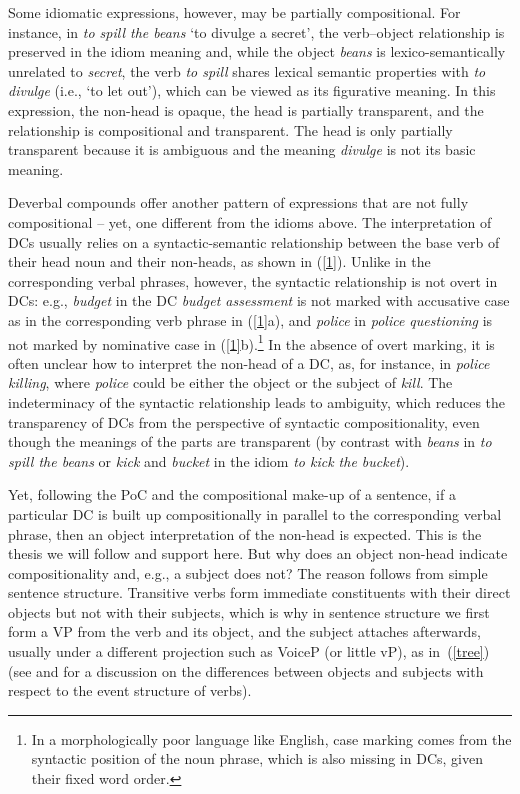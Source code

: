 \documentclass[output=paper]{langsci/langscibook}
\begin{document}
Some idiomatic expressions, however, may be partially compositional. For instance, in \textit{to spill the beans} \lq to divulge a secret\rq, the verb--object relationship is preserved in the idiom meaning and, while the object \textit{beans} is lexico-semantically unrelated to \textit{secret}, the verb \textit{to spill} shares lexical semantic properties with \textit{to divulge} (i.e., \lq to let out\rq), which can be viewed as its figurative meaning. In this expression, the non-head is opaque, the head is partially transparent, and the relationship is compositional and transparent. The head is only partially transparent because it is ambiguous and the meaning \textit{divulge} is not its basic meaning.

 {Deverbal compounds offer another pattern of expressions that are not fully compositional -- yet, one different from the idioms above. The interpretation of DCs usually relies on a syntactic-semantic relationship between the base verb of their head noun and their non-heads, as shown in (\ref{1}). Unlike in the corresponding verbal phrases, however, the syntactic relationship is not overt in DCs: e.g., \textit{budget} in the DC \textit{budget assessment} is not marked with accusative case as in the corresponding verb phrase in (\ref{1}a), and \textit{police} in \textit{police questioning} is not marked by nominative case in (\ref{1}b).}\footnote{ {In a morphologically poor language like English,  case marking comes from the syntactic position of the noun phrase, which is also missing in DCs, given their fixed word order.}}  {In the absence of overt marking, it is often unclear how to interpret the non-head of a DC, as, for instance, in \textit{police killing}, where \textit{police} could be either the object or the subject of \textit{kill}. The indeterminacy of the syntactic relationship leads to ambiguity, which reduces the transparency of DCs from the perspective of syntactic compositionality, even though the meanings of the parts are transparent (by contrast with \textit{beans} in \textit{to spill the beans} or \textit{kick} and \textit{bucket} in the idiom \textit{to kick the bucket}).}


 {Yet, following the PoC and the compositional make-up of a sentence, if a particular DC is built up compositionally in parallel to the corresponding verbal phrase, then an object interpretation of the non-head is expected. This is the thesis we will follow and support  here. But why does an object non-head indicate compositionality and, e.g., a subject does not? The reason follows from simple sentence structure. Transitive verbs form immediate constituents with their direct objects but not with their subjects, which is why in sentence structure we first form a VP from the verb and its object, and the subject attaches afterwards, usually under a different projection such as VoiceP (or little vP), as in~(\ref{tree}) (see \cite{chomsky:95} and \cite{kratzer:96} for a discussion on the differences between objects and subjects with respect to the event structure of verbs).}
\end{document}
